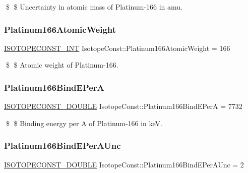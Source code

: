 \$ \$ Uncertainty in atomic mass of Platinum-\/166 in amu. \mbox{\label{group___isotope_const-_platinum-_pt166_ga64e082e4f77211ade2d60b4bbc89495d}} 
\subsubsection{\texorpdfstring{Platinum166\+Atomic\+Weight}{Platinum166AtomicWeight}}
{\footnotesize\ttfamily \mbox{\hyperlink{group___isotope_const-_macros_ga5f18360b3e99483a35c32d789e62621c}{I\+S\+O\+T\+O\+P\+E\+C\+O\+N\+S\+T\+\_\+\+I\+NT}} Isotope\+Const\+::\+Platinum166\+Atomic\+Weight = 166}

\$ \$ Atomic weight of Platinum-\/166. \mbox{\label{group___isotope_const-_platinum-_pt166_ga71f6eebc235680fde8ce1ee5b7608320}} 
\subsubsection{\texorpdfstring{Platinum166\+Bind\+E\+PerA}{Platinum166BindEPerA}}
{\footnotesize\ttfamily \mbox{\hyperlink{group___isotope_const-_macros_ga8f45a7272ce02c0b4c65c44636ed719a}{I\+S\+O\+T\+O\+P\+E\+C\+O\+N\+S\+T\+\_\+\+D\+O\+U\+B\+LE}} Isotope\+Const\+::\+Platinum166\+Bind\+E\+PerA = 7732}

\$ \$ Binding energy per A of Platinum-\/166 in keV. \mbox{\label{group___isotope_const-_platinum-_pt166_ga96fb1cf7eb0309a236cf06a56e796c9f}} 
\subsubsection{\texorpdfstring{Platinum166\+Bind\+E\+Per\+A\+Unc}{Platinum166BindEPerAUnc}}
{\footnotesize\ttfamily \mbox{\hyperlink{group___isotope_const-_macros_ga8f45a7272ce02c0b4c65c44636ed719a}{I\+S\+O\+T\+O\+P\+E\+C\+O\+N\+S\+T\+\_\+\+D\+O\+U\+B\+LE}} Isotope\+Const\+::\+Platinum166\+Bind\+E\+Per\+A\+Unc = 2}

